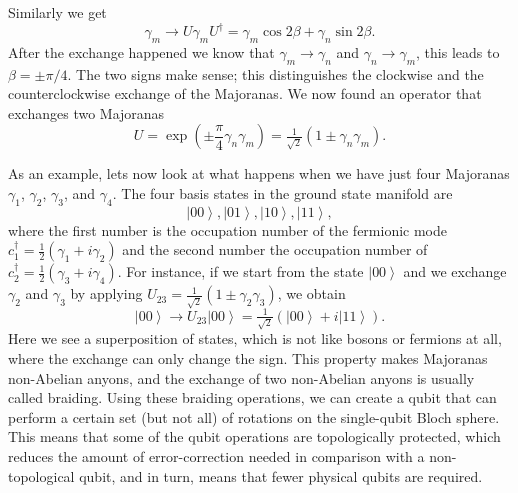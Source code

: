Similarly we get
\begin{equation}
\gamma_{m}\to U\gamma_{m}U^{\dagger}=\gamma_{m}\cos2\beta+\gamma_{n}\sin2\beta.
\end{equation}
After the exchange happened we know that $\gamma_{m}\to\gamma_{n}$ and $\gamma_{n}\to\gamma_{m}$, this leads to $\beta=\pm\pi/4$.
The two signs make sense; this distinguishes the clockwise and the counterclockwise exchange of the Majoranas.
We now found an operator that exchanges two Majoranas
\begin{equation}
U=\exp\left(\pm\frac{\pi}{4}\gamma_{n}\gamma_{m}\right)=\tfrac{1}{\sqrt{2}}\left(1\pm\gamma_{n}\gamma_{m}\right).\label{eq:U_nm}
\end{equation}

As an example, lets now look at what happens when we have just four Majoranas $\gamma_{1}$, $\gamma_{2}$, $\gamma_{3}$, and $\gamma_{4}$.
The four basis states in the ground state manifold are
\begin{equation}
\left|00\right\rangle ,\left|01\right\rangle ,\left|10\right\rangle ,\left|11\right\rangle ,\label{eq:basis}
\end{equation}
where the first number is the occupation number of the fermionic mode $c_{1}^{\dagger}=\tfrac{1}{2}(\gamma_{1}+i\gamma_{2})$ and the second number the occupation number of $c_{2}^{\dagger}=\tfrac{1}{2}(\gamma_{3}+i\gamma_{4})$.
For instance, if we start from the state $\left|00\right\rangle $ and we exchange $\gamma_{2}$ and $\gamma_{3}$ by applying $U_{23}=\tfrac{1}{\sqrt{2}}\left(1\pm\gamma_{2}\gamma_{3}\right)$, we obtain
\begin{equation}
\left|00\right\rangle \to U_{23}\left|00\right\rangle =\tfrac{1}{\sqrt{2}}\left(\left|00\right\rangle +i\left|11\right\rangle \right).
\end{equation}
Here we see a superposition of states, which is not like bosons or fermions at all, where the exchange can only change the sign.
This property makes Majoranas non-Abelian anyons, and the exchange of two non-Abelian anyons is usually called braiding.
Using these braiding operations, we can create a qubit that can perform a certain set (but not all) of rotations on the single-qubit Bloch sphere.
This means that some of the qubit operations are topologically protected, which reduces the amount of error-correction needed in comparison with a non-topological qubit, and in turn, means that fewer physical qubits are required.


